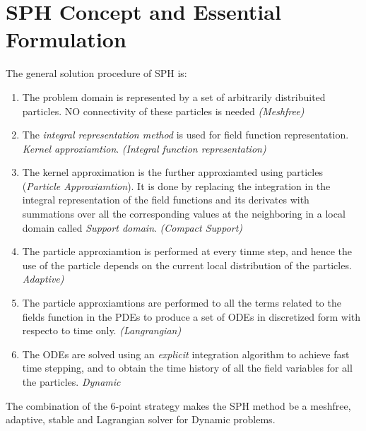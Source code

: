 \documentclass[12pt]{book}
\begin{document}
\section{SPH Concept and Essential Formulation}
The general solution procedure of SPH is:
\begin{enumerate}
\item The problem domain is represented by a set of arbitrarily distribuited particles. NO connectivity of these particles is needed \textit{(Meshfree)}
\item The \textit{integral representation method} is used for field function representation. \textit{Kernel approxiamtion}. \textit{(Integral function representation)}
\item The kernel approximation is the further approxiamted using particles (\textit{Particle Approxiamtion}). It is done by replacing the integration in the integral representation of the field functions and its derivates with summations over all the corresponding values at the neighboring in a local domain called \textit{Support domain}. \textit{(Compact Support)}
\item The particle approxiamtion is performed at every tinme step, and hence the use of the particle depends on the current local distribution of the particles. \textit{Adaptive)}
\item The particle approxiamtions are performed to all the terms related to the fields function in the PDEs to produce a set of ODEs in discretized form with respecto to time only. \textit{(Langrangian)}
\item The ODEs are solved using an \textit{explicit} integration algorithm to achieve fast time stepping, and to obtain the time history of all the field variables for all the particles. \textit{Dynamic}
\end{enumerate}
The combination of the 6-point strategy makes the SPH method be a meshfree, adaptive, stable and Lagrangian solver for Dynamic problems.
\end{document}
